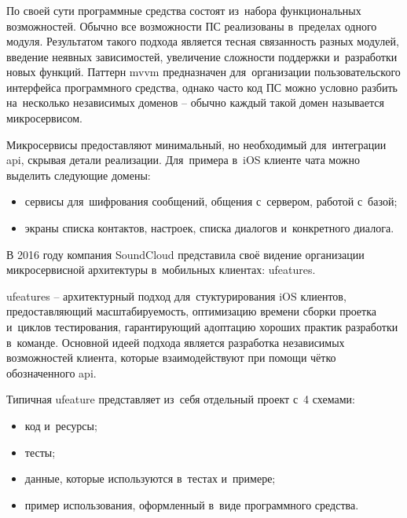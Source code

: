 \subsubsection{}
\label{sec:analysis:research:mobArch:ufeature}

По своей сути программные средства состоят из~набора функциональных возможностей. Обычно все возможности ПС реализованы в~пределах одного модуля. Результатом такого подхода является тесная связанность разных модулей, введение неявных зависимостей, увеличение сложности поддержки и~разработки новых функций. Паттерн \gls{mvvm} предназначен для~организации пользовательского интерфейса программного средства, однако часто код ПС можно условно разбить на~несколько независимых доменов -- обычно каждый такой домен называется микросервисом.

Микросервисы предоставляют минимальный, но необходимый для~интеграции \gls{api}, скрывая детали реализации. Для~примера в~iOS клиенте чата можно выделить следующие домены:

\begin{itemize}
	\item сервисы для~шифрования сообщений, общения с~сервером, работой с~базой;
	\item экраны списка контактов, настроек, списка диалогов и~конкретного диалога.
\end{itemize}

В 2016 году компания SoundCloud представила своё видение организации микросервисной архитектуры в~мобильных клиентах: \glspl{ufeature}.

\glspl{ufeature} -- архитектурный подход для~стуктурирования iOS клиентов, предоставляющий масштабируемость, оптимизацию времени сборки проетка и~циклов тестирования, гарантирующий адоптацию хороших практик разработки в~команде. Основной идеей подхода является разработка независимых возможностей клиента, которые взаимодействуют при помощи чётко обозначенного \gls{api}\cite{soundcloud:ufeature}.

Типичная \gls{ufeature} представляет из~себя отдельный проект с~4 схемами:

\begin{itemize}
	\item код и~ресурсы;
	\item тесты;
	\item данные, которые используются в~тестах и~примере;
	\item пример использования, оформленный в~виде программного средства.
\end{itemize}

